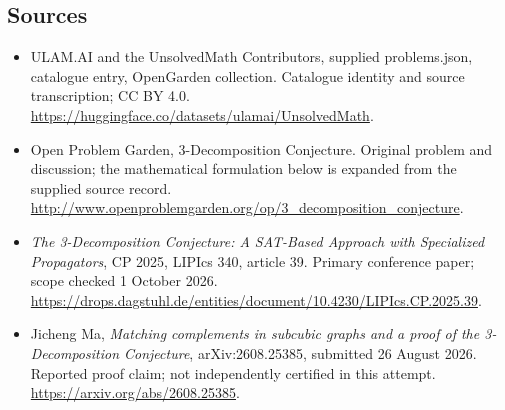 \documentclass[11pt,a4paper]{article}
\begin{document}
\subsection{Sources}
\begin{itemize}
\item[S1] ULAM.AI and the UnsolvedMath Contributors, supplied problems.json, catalogue entry, OpenGarden collection. Catalogue identity and source transcription; CC BY 4.0.
\url{https://huggingface.co/datasets/ulamai/UnsolvedMath}.
\item[S2] Open Problem Garden, 3-Decomposition Conjecture. Original problem and discussion; the mathematical formulation below is expanded from the supplied source record.
\url{http://www.openproblemgarden.org/op/3_decomposition_conjecture}.

\item[R1] \emph{The 3-Decomposition Conjecture: A SAT-Based Approach
with Specialized Propagators}, CP 2025, LIPIcs 340, article 39.
Primary conference paper; scope checked 1 October 2026.
\url{https://drops.dagstuhl.de/entities/document/10.4230/LIPIcs.CP.2025.39}.
\item[R2] Jicheng Ma, \emph{Matching complements in subcubic graphs
and a proof of the 3-Decomposition Conjecture}, arXiv:2608.25385,
submitted 26 August 2026. Reported proof claim; not independently
certified in this attempt.
\url{https://arxiv.org/abs/2608.25385}.

\end{itemize}
\end{document}
